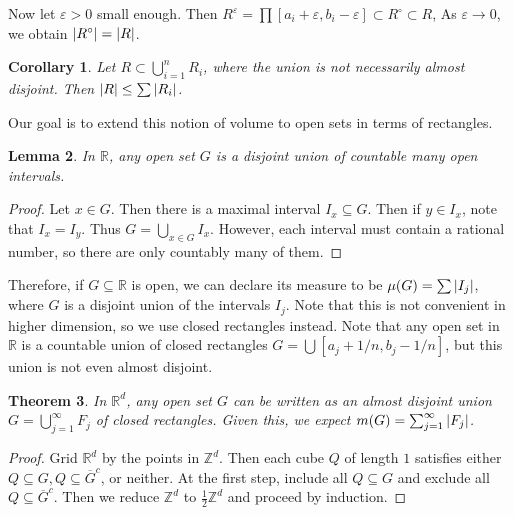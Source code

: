 \documentclass[leqno, openany]{memoir}
\newtheorem{thm}{Theorem}[chapter]
\newtheorem{cor}[thm]{Corollary}
\newtheorem{lem}[thm]{Lemma}
\theoremstyle{definition}
\theoremstyle{remark}
\theoremstyle{plain}
\theoremstyle{definition}
\theoremstyle{remark}
\newcommand{\R}{\mathbb{R}}
\newcommand{\Z}{\mathbb{Z}}
\newcommand{\ep}{\varepsilon}
\newcommand{\ol}[1]{\overline{#1}}
\begin{document}
Now let $\ep > 0$ small enough. Then $R^{\ep} = \prod [a_i + \ep, b_i - \ep] \subset R^{\circ} \subset R$, As $\ep \to 0$, we obtain $\abs{R^{\circ}} = \abs{R}$.

\begin{cor}
    Let $R \subset \bigcup_{i=1}^n R_i$, where the union is not necessarily almost disjoint. Then $\abs{R} \leq \sum \abs{R_i}$.
\end{cor}

Our goal is to extend this notion of volume to open sets in terms of rectangles.

\begin{lem}
    In $\R$, any open set $G$ is a disjoint union of countable many open intervals.
\end{lem}

\begin{proof}
    Let $x \in G$. Then there is a maximal interval $I_x \subseteq G$. Then if $y \in I_x$, note that $I_x = I_y$. Thus $G = \bigcup_{x \in G} I_x$. However, each interval must contain a rational number, so there are only countably many of them.
\end{proof}

Therefore, if $G \subseteq \R$ is open, we can declare its measure to be $\mu(G) = \sum \abs{I_j}$, where $G$ is a disjoint union of the intervals $I_j$. Note that this is not convenient in higher dimension, so we use closed rectangles instead. Note that any open set in $\R$ is a countable union of closed rectangles $G = \bigcup [a_j + 1/n, b_j - 1/n]$, but this union is not even almost disjoint.

\begin{thm}
    In $\R^d$, any open set $G$ can be written as an almost disjoint union $G = \bigcup_{j=1}^{\infty} F_j$ of closed rectangles. Given this, we expect $m(G) = \sum_{j=1}^{\infty} \abs{F_j}$.
\end{thm}

\begin{proof}
    Grid $\R^d$ by the points in $\Z^d$. Then each cube $Q$ of length $1$ satisfies either $Q \subseteq G, Q \subseteq \ol{G}^c$, or neither. At the first step, include all $Q \subseteq G$ and exclude all $Q \subseteq \ol{G}^c$. Then we reduce $\Z^d$ to $\frac{1}{2} \Z^d$ and proceed by induction.
\end{proof}
\end{document}
